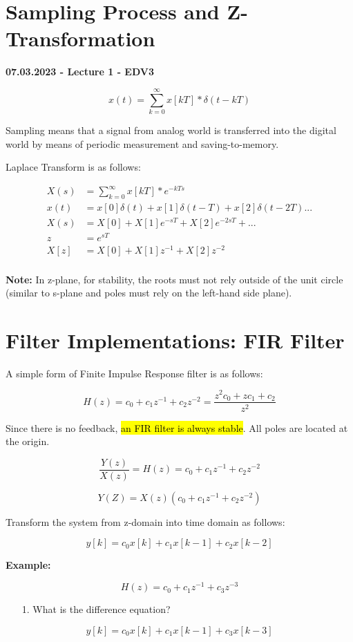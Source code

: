 \section{Sampling Process and Z-Transformation}

\textbf{07.03.2023 - Lecture 1 - EDV3}

$$x(t) = \sum_{k=0}^{\infty}x[kT]* \delta(t-kT)$$

Sampling means that a signal from analog world is transferred into the digital world by means of periodic measurement and saving-to-memory.

Laplace Transform is as follows:

\begin{align*}
	X(s) &= \sum_{k=0}^{\infty}x[kT]*e^{-kTs} \\
	x(t) &= x[0]\delta(t) + x[1]\delta(t-T) + x[2]\delta(t-2T) ... \\
	X(s) &= X[0] + X[1]e^{-sT} + X[2]e^{-2sT} + ... \\
	   z &= e^{sT} \\
	X[z] &= X[0] + X[1]z^{-1} + X[2]z^{-2} \\
\end{align*}

\textbf{Note:} In z-plane, for stability, the roots must not rely outside of the unit circle (similar to s-plane and poles must rely on the left-hand side plane).

\section{Filter Implementations: FIR Filter}

A simple form of Finite Impulse Response filter is as follows:

$$H(z) = c_0 +c_1z^{-1}+c_2z^{-2} = \frac{z^{2}c_0 +zc_1+c_2}{z^2}$$


Since there is no feedback, \hl{an FIR filter is always stable}. All poles are located at the origin.

$$ \frac{Y(z)}{X(z)} = H(z) = c_0 + c_1z^{-1}+c_2z^{-2} $$

$$ Y(Z) = X(z)(c_0 + c_1z^{-1}+c_2z^{-2}) $$

Transform the system from z-domain into time domain as follows:

$$y[k] = c_0x[k] + c_1x[k-1] + c_2x[k-2]$$

\textbf{Example:}

$$ H(z) = c_0 + c_1z^{-1} + c_3z^{-3} $$

\begin{itemize}
	\item[1.] What is the difference equation?
\end{itemize}
$$y[k] = c_0x[k] + c_1x[k-1] + c_3x[k-3]$$

